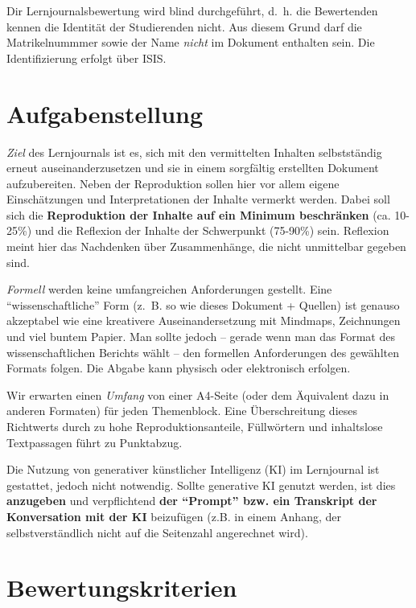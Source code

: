 \documentclass[DIV=15,headinclude=true]{scrreprt}
\begin{document}
\begin{framed}
Dir Lernjournalsbewertung wird blind durchgeführt, d.\ h. die Bewertenden kennen die Identität der Studierenden nicht. Aus diesem Grund darf die Matrikelnummmer sowie der Name \emph{nicht} im Dokument enthalten sein. Die Identifizierung erfolgt über ISIS.
\end{framed}


\section{Aufgabenstellung}

\emph{Ziel} des Lernjournals ist es, sich mit den vermittelten Inhalten
selbstständig erneut auseinanderzusetzen und sie in einem sorgfältig
erstellten Dokument aufzubereiten. Neben der Reproduktion sollen hier
vor allem eigene Einschätzungen und Interpretationen der Inhalte vermerkt
werden. Dabei soll sich die \textbf{Reproduktion der Inhalte auf ein Minimum
	beschränken} (ca. 10-25\%) und die Reflexion der Inhalte der Schwerpunkt
(75-90\%) sein. Reflexion meint hier das Nachdenken über Zusammenhänge,
die nicht unmittelbar gegeben sind.

\emph{Formell} werden keine umfangreichen Anforderungen gestellt. Eine
\enquote{wissenschaftliche} Form (z.~B. so wie dieses Dokument +
Quellen) ist genauso akzeptabel wie eine kreativere Auseinandersetzung
mit Mindmaps, Zeichnungen und viel buntem Papier. Man sollte jedoch -- gerade wenn man das Format des wissenschaftlichen Berichts wählt -- den formellen Anforderungen des gewählten Formats folgen. Die Abgabe kann
physisch oder elektronisch erfolgen.

Wir erwarten einen \emph{Umfang} von einer A4-Seite (oder dem
Äquivalent dazu in anderen Formaten) für jeden Themenblock. Eine Überschreitung dieses Richtwerts durch zu hohe Reproduktionsanteile, Füllwörtern und inhaltslose Textpassagen führt zu Punktabzug.

Die Nutzung von generativer künstlicher Intelligenz (KI) im Lernjournal ist gestattet, jedoch nicht notwendig. Sollte generative KI genutzt werden, ist dies \textbf{anzugeben} und verpflichtend \textbf{der "`Prompt"' bzw. ein Transkript der Konversation mit der KI} beizufügen (z.B. in einem Anhang, der selbstverständlich nicht auf die Seitenzahl angerechnet wird).

\section{Bewertungskriterien}
\end{document}

